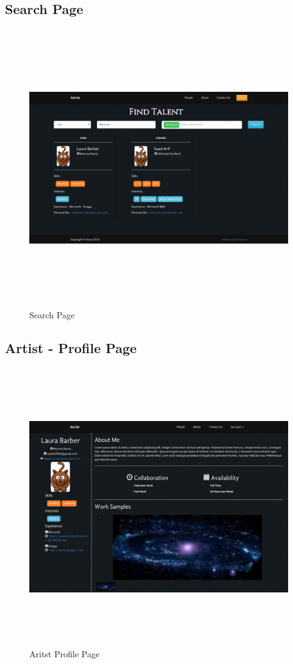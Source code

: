 \documentclass[a4paper,oneside,11pt]{report}
\begin{document}
\begin{appendices}
\subsection{Search Page}
\begin{figure}[!ht]
\centering
\includegraphics[width=\textwidth,height=12cm,keepaspectratio]{appendix/third-iteration-full-search-page.png}
\caption{Search Page}
\end{figure}

\pagebreak
\subsection{Artist - Profile Page}
\begin{figure}[!ht]
\centering
\includegraphics[width=\textwidth,height=12cm,keepaspectratio]{appendix/third-iteration-full-artist-profile-page.png}
\caption{Aritst Profile Page}
\end{figure}


\end{appendices}
\end{document}

